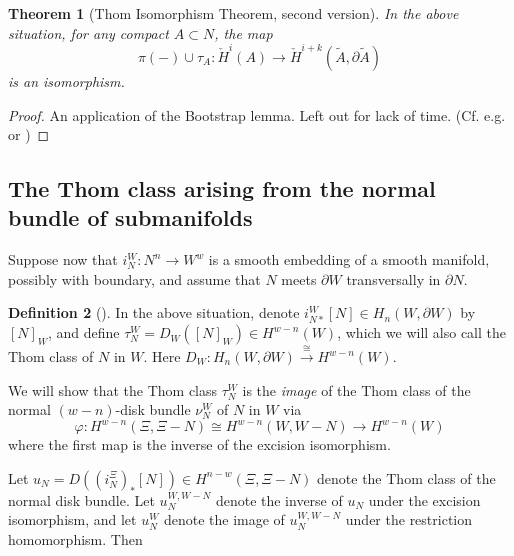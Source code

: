 \documentclass[reqno]{amsart}
\newtheorem{theorem}{Theorem}[section]
\theoremstyle{definition}
\newtheorem{definition}[theorem]{Definition}
\theoremstyle{remark}
\begin{document}
      \begin{theorem}[Thom Isomorphism Theorem, second version]
          In the above situation, for any compact $A \subset N$, the map
          \[
          \pi (-) \cup \tau_A \colon
          \check{H}^{i}(A) \to \check{H}^{i+k}(\tilde{A}, \partial \tilde{A})
          \] 
          is an isomorphism.
      \end{theorem}


      \begin{proof}
          An application of the Bootstrap lemma. Left out
          for lack of time.
          (Cf. e.g. \cite{Dold} or \cite{Bredon})
      \end{proof}


      \subsection{The Thom class arising from the normal bundle
      of submanifolds}

      Suppose now that
      $i_{N}^{W} \colon N^{n} \to W^{w}$ is a smooth
      embedding of a smooth manifold, possibly with boundary,
      and assume that $N$ meets $\partial W$ transversally
      in $\partial N$.

      \begin{definition}[]
          In the above situation, denote 
          $i_{N*}^{W} \left[ N \right] \in H_n(W, \partial W)$  by
          $\left[ N \right]_W$, and define
          $\tau_N^{W} = D_W \left( \left[ N \right]_W \right) 
          \in H^{w-n}(W)$, which we will also call the Thom class of
          $N$ in $W$.
          Here $D_W \colon H_n (W, \partial W) \stackrel{\cong}{\to} 
          H^{w-n}(W)$.
      \end{definition}

      We will show that the Thom class
      $\tau_N^{W}$ is the \textit{image} of the Thom class
      of the normal $(w-n)$-disk bundle $\nu_N^{W}$ of
      $N$ in $W$ via
      \[
      \varphi \colon H^{w-n}\left( \Xi, \Xi - N \right) \cong
      H^{w-n}\left( W, W- N \right) 
      \to H^{w-n}(W)
      \] 
      where the first map is the inverse of the
      excision isomorphism.

      Let $u_N = 
      D(\left( i_{N}^{\Xi} \right)_* \left[ N \right])
      \in H^{n-w} \left( \Xi , \Xi - N \right) $ denote
      the Thom class of the normal disk bundle.
      Let $u_N^{W, W-N}$ denote the inverse
      of $u_N$ under the
      excision isomorphism, and let
      $u_N^{W}$ denote the image of $u_N^{W , W-N}$ under the
      restriction homomorphism.
      Then
\end{document}
